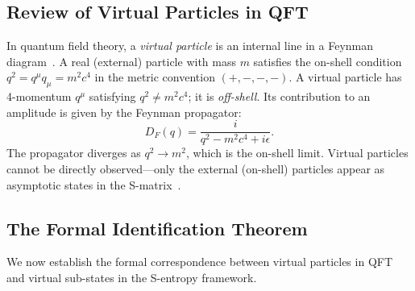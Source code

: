 \documentclass[twocolumn,10pt,a4paper]{article}
\theoremstyle{thmstyle}
\theoremstyle{definition}
\theoremstyle{remark}
\begin{document}
\subsection{Review of Virtual Particles in QFT}

In quantum field theory, a \emph{virtual particle} is an internal
line in a Feynman diagram~\citep{feynman1949space,peskin1995introduction}.
A real (external) particle with mass $m$ satisfies the on-shell
condition $q^2 = q^\mu q_\mu = m^2 c^4$ in the metric convention
$(+,-,-,-)$. A virtual particle has 4-momentum $q^\mu$ satisfying
$q^2 \neq m^2 c^4$; it is \emph{off-shell}. Its contribution to an
amplitude is given by the Feynman propagator:
\begin{equation}
D_F(q) = \frac{i}{q^2 - m^2 c^4 + i\epsilon}.
\end{equation}
The propagator diverges as $q^2 \to m^2$, which is the on-shell limit.
Virtual particles cannot be directly observed---only the external
(on-shell) particles appear as asymptotic states in the
S-matrix~\citep{heisenberg1943smatrix,dyson1949smatrix}.

\subsection{The Formal Identification Theorem}

We now establish the formal correspondence between virtual particles
in QFT and virtual sub-states in the S-entropy framework.
\end{document}
